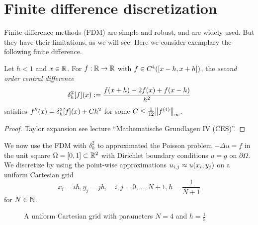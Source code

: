 \section{Finite difference discretization}

Finite difference methods (FDM) are simple and robust, and are widely used.
But they have their limitations, as we will see.
Here we consider exemplary the following finite difference.

\begin{theorem}
	Let \(h < 1\) and \(x \in \R\).
	For \(f: \R \to \R\) with \(f \in C^4\parentheses*{\brackets*{x - h, x + h}}\), the \emph{second order central difference}
	\[
		\delta_h^2\brackets*{f}\parentheses*{x} := \frac{f\parentheses*{x + h} - 2f\parentheses*{x} + f\parentheses*{x - h}}{h^2}
	\]
	satisfies \(f''\parentheses*{x} = \delta_h^2\brackets*{f}\parentheses*{x} + Ch^2\) for some \(C \le \frac{1}{12}\norm*{f^{\parentheses*{4}}}_\infty\).
\end{theorem}

\begin{proof}
	Taylor expansion see lecture ``Mathematische Grundlagen IV (CES)''.
\end{proof}

We now use the FDM with \(\delta_h^2\) to approximated the Poisson problem \(-\Delta u = f\) in the unit square \(\Omega = \brackets*{0, 1} \subset \R^2\) with Dirichlet boundary conditions \(u = g\) on \(\partial\Omega\).
We discretize by using the point-wise approximations \(u_{i, j} \approx u\parentheses*{x_i, y_j}\) on a uniform Cartesian grid
\[
	x_i = ih, y_j = jh, \quad i, j = 0, \ldots, N + 1, h = \frac{1}{N + 1}
\]
for \(N \in \N\).

\begin{figure}[h]
	\centering
	\caption{A uniform Cartesian grid with parameters \(N = 4\) and \(h = \frac{1}{5}\)}
	\label{fig:1-1}
\end{figure}

